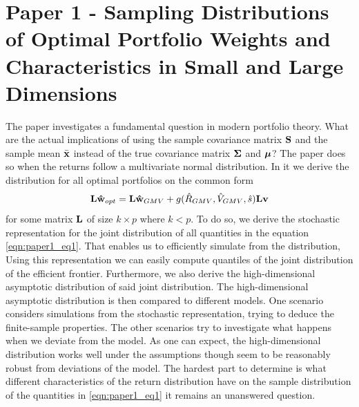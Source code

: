 \documentclass[oneside]{book}\usepackage{knitr}
\begin{document}
\section{Paper 1 - Sampling Distributions of Optimal Portfolio Weights and Characteristics in Small and Large Dimensions}\label{sec:paper1}
The paper investigates a fundamental question in modern portfolio theory. 
What are the actual implications of using the sample covariance matrix $\mathbf{S}$ and the sample mean $\bar{\mathbf{x}}$ instead of the true covariance matrix $\mathbf{\Sigma}$ and $\mbox{\boldmath$\mu$}$?
The paper does so when the returns follow a multivariate normal distribution. 
In it we derive the distribution for all optimal portfolios on the common form
\begin{equation}\label{eqn:paper1_eq1}
  \mathbf{L}\mathbf{\hat{w}}_{opt} = \mathbf{L}\mathbf{\hat{w}}_{GMV} + g(\hat{R}_{GMV}, \hat{V}_{GMV}, \hat{s})\mathbf{L}\mathbf{v}
\end{equation}
for some matrix $\mathbf{L}$ of size $k \times p$ where $k<p$.
To do so, we derive the stochastic representation for the joint distribution of all quantities in the equation \eqref{eqn:paper1_eq1}. 
That enables us to efficiently simulate from the distribution, 
Using this representation we can easily compute quantiles of the joint distribution of the efficient frontier.
Furthermore, we also derive the high-dimensional asymptotic distribution of said joint distribution. 
The high-dimensional asymptotic distribution is then compared to different models.
One scenario considers simulations from the stochastic representation, trying to deduce the finite-sample properties.
The other scenarios try to investigate what happens when we deviate from the model.
As one can expect, the high-dimensional distribution works well under the assumptions though seem to be reasonably robust from deviations of the model.
The hardest part to determine is what different characteristics of the return distribution have on the sample distribution of the quantities in \eqref{eqn:paper1_eq1} it remains an unanswered question.
\end{document}
